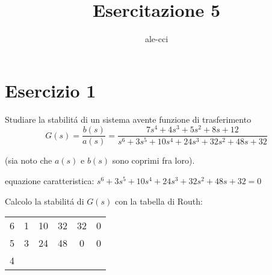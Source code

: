 \documentclass{article}
\title{Esercitazione 5}
\author{ale-cci}
\begin{document}
\section{Esercizio 1}
Studiare la stabilit\'a di un sistema avente funzione di trasferimento
\[ G(s) = \frac{b(s)}{a(s)} = \frac{7s^4 + 4s^3 + 5s^2 + 8s + 12}{s^6 + 3s^5 + 10s^4 + 24s^3 + 32 s^2 + 48 s + 32}\]

(sia noto che $a(s)$ e $b(s)$ sono coprimi fra loro).

equazione caratteristica: $s^6 + 3s^5 + 10s^4 + 24s^3 + 32 s^2 + 48 s + 32 = 0$

Calcolo la stabilit\'a di $G(s)$ con la tabella di Routh:

\begin{tabular}{c|c c c c c}
        6 & 1 & 10 & 32 & 32 & 0\\
        5 & 3 & 24 & 48 & 0  & 0\\
        4 &
\end{tabular}
\end{document}

